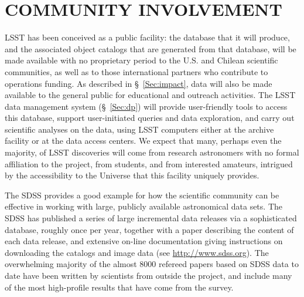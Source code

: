 \section{COMMUNITY INVOLVEMENT}
\label{Sec:community}

LSST has been conceived as a public facility: the database that it will
produce, and the associated object catalogs that are generated from that
database, will be made available with no proprietary period to the
U.S. and Chilean scientific communities, as well as to those
international partners who contribute to operations funding.  As
described in \S~\ref{Sec:impact}, data will also be made available to
the general public for educational and outreach activities.
The LSST data management
system (\S~\ref{Sec:dp}) will provide user-friendly tools to access this database, support
user-initiated queries and data exploration, and carry out scientific analyses on the
data, using LSST computers either at the archive facility
or at the data access centers.
We expect that many, perhaps even the majority,
of LSST discoveries will come from research astronomers with no formal
affiliation to the project, from students, and from interested amateurs,
intrigued by the accessibility to the Universe that this facility uniquely
provides.

The SDSS provides a good example for how the scientific
community can be effective in working with large, publicly available
astronomical data sets. The SDSS has published a series of large incremental
data releases via a sophisticated database, roughly once per year, together with
a paper describing the content of each data release, and extensive on-line
documentation giving instructions on downloading the catalogs and image data
(see \url{http://www.sdss.org}). The overwhelming majority of the almost
8000 refereed papers based
on SDSS data to date have been written by scientists from outside
the project, and  include many of the most high-profile results that have come
from the survey.

